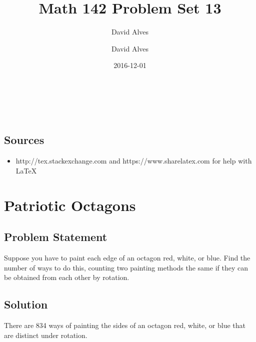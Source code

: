 \documentclass[12pt]{article}
\author{David Alves}
\title{Math 142 Problem Set 13}
\author{David Alves}
\date{2016-12-01}
\newcommand{\ProblemStatement}[1]{
\subsection*{Problem Statement}
#1
\subsection*{Solution}
}
\begin{document}

\begin{center}
\large \thetitle \\
\theauthor \\
\thedate
\end{center}

\subsection*{Sources}

    \begin{itemize}
    \item http://tex.stackexchange.com and https://www.sharelatex.com for help with \LaTeX
    \end{itemize}

\section{Patriotic Octagons}
\ProblemStatement{
Suppose you have to paint each edge of an octagon red, white, or blue. Find the
number of ways to do this, counting two painting methods the same if they can be
obtained from each other by rotation.
}
 
There are 834 ways of painting the sides of an octagon red, white, or blue that
are distinct under rotation.
\end{document}
